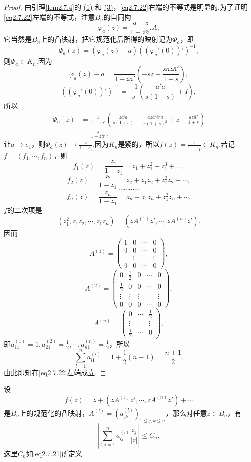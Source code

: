 \begin{proof}
	由引理\ref{lem2.7.4}的 \hyperlink{2.7.4}{(1)} 和 \hyperlink{2.7.4}{(3)}，\eqref{eq2.7.22}右端的不等式是明显的.为了证明\eqref{eq2.7.22}左端的不等式，注意$B_n$的自同构
	\[\varphi_a(z)=\frac{a-z}{1-z\bar{a}'}A,\]
	它当然是$B_n$上的凸映射，把它规范化后所得的映射记为$\Phi_a$，即
	\[\Phi_a(z)=(\varphi_a(z)-a)((\varphi_a'(0))')^{-1},\]
	则$\Phi_a\in K_n$.因为
	\[\varphi_a(z)-a=\frac1{1-z\bar{a}'}\left(-sz+\frac{saz\bar{a}'}{1+s}\right),\]
	\[((\varphi_a'(0))')^{-1}=\frac{-1}{s}\left(\frac{\bar{a}'a}{s(1+s)}+I\right),\]
	所以
	\begin{align*}
		\Phi_a(z)
		&=\frac1{1-z\bar{a}'}\left(\frac{z\bar{a}'a}{s(1+s)}-\frac{az\bar{a}'\bar{a}'a}{s(1+s)^2}+z-\frac{az\bar{a}'}{1+s}\right)\\
		&=\frac{z}{1-z\bar{a}'},
	\end{align*}
让$a\to e_1$，则$\Phi_a(z)\to\frac{z}{1-z_1}$.因为$K_n$是紧的，所以$f(z)=\frac{z}{1-z_1}\in K_n$.若记$f=(f_1,\cdots,f_n)$，则
\[f_1(z)=\frac{z_1}{1-z_1}=z_1+z_1^2+z_1^3+\dots,\]
\[f_2(z)=\frac{z_2}{1-z_1}=z_2+z_1z_2+z_1^2 z_2+\cdots,\]
\[\cdots\cdots\cdots\cdots\]
\[f_n(z)=\frac{z_n}{1-z_1}=z_n+z_1z_n+z_1^2 z_n+\cdots.\]
$f$的二次项是
\[(z_1^2,z_1z_2,\cdots,z_1z_n)=(zA^{(1)}z',\cdots,zA^{(n)}z').\]
因而
\[A^{(1)}=\begin{pmatrix}
	1 & 0 & \cdots&0\\
	0 & 0 & \cdots&0\\
	\vdots & \vdots & &\vdots\\
	0 & 0 & \cdots&0
\end{pmatrix},\]
\[A^{(2)}=\begin{pmatrix}
	0 & \frac12 & 0 & \cdots & 0\\
	\frac12 & 0 & 0 & \cdots & 0\\
	\vdots & \vdots & \vdots & &\vdots\\
	0 & 0 & 0 & \cdots & 0
\end{pmatrix},\]
\[A^{(n)}=\begin{pmatrix}
	0 & \cdots & \frac12\\
	\vdots & &\vdots\\
	\frac12 & \cdots & 0
\end{pmatrix},\]
即$a_{11}^{(1)}=1,a_{21}^{(2)}=\frac12,\cdots,a_{n1}^{(n)}=\frac12$，所以
\[\sum_{l=1}^{n}a_{l1}^{(l)}=1+\frac12(n-1)=\frac{n+1}{2}.\]
由此即知在\eqref{eq2.7.22}左端成立.
\end{proof}
\begin{lemma}\label{lem2.7.6}
	设
	\[f(z)=z+(zA^{(1)}z',\cdots,zA^{(n)}z')+\cdots\]
	是$B_n$上的规范化的凸映射，$A^{(l)}=(a_{jk}^{(l)})_{1\le j,k\le n}$，那么对任意$z\in B_n$，有
	\begin{equation}\label{eq2.7.23}
		\left|\sum_{l,j=1}^n a_{lj}^{(l)}\frac{z_j}{|z|}\right|\le C_n,
	\end{equation}
这里$C_n$如\eqref{eq2.7.21}所定义.
\end{lemma}
